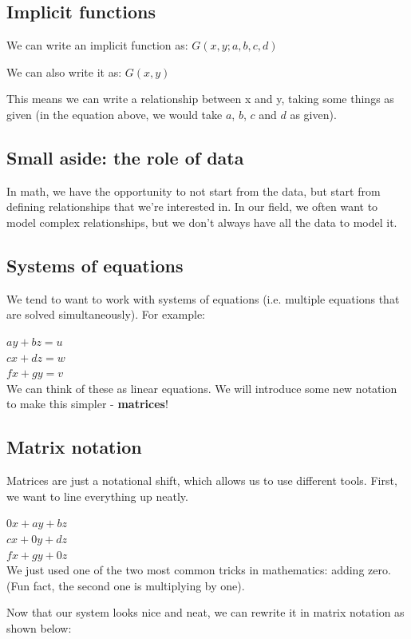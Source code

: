 \documentclass[12pt]{article}
\begin{document}
\subsection{Implicit functions}
We can write an implicit function as: \(G(x,y;a,b,c,d)\)

We can also write it as: \(G(x,y)\)

This means we can write a relationship between x and y, taking some things as given (in the equation above, we would take $a$, $b$, $c$ and $d$ as given).

\subsection{Small aside: the role of data}
In math, we have the opportunity to not start from the data, but start from defining relationships that we're interested in. In our field, we often want to model complex relationships, but we don't always have all the data to model it. 

\subsection{Systems of equations}
We tend to want to work with systems of equations (i.e. multiple equations that are solved simultaneously). For example:

\(ay+bz=u\)\\
\(cx+dz=w\)\\
\(fx+gy=v\)\\

We can think of these as linear equations. We will introduce some new notation to make this simpler - \textbf{matrices}!

\subsection{Matrix notation}
Matrices are just a notational shift, which allows us to use different tools. First, we want to line everything up neatly.

\(0x+ay+bz\)\\
\(cx+0y+dz\)\\
\(fx+gy+0z\)\\

We just used one of the two most common tricks in mathematics: adding zero. (Fun fact, the second one is multiplying by one). 

Now that our system looks nice and neat, we can rewrite it in matrix notation as shown below:
\end{document}
